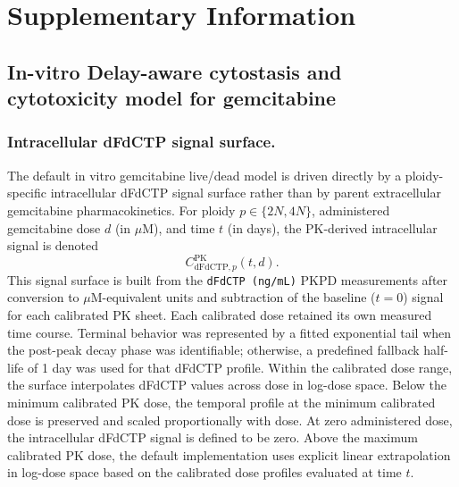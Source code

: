 \documentclass[11pt,notitlepage]{article}
\begin{document}

\clearpage

\section{Supplementary Information}


\renewcommand{\figurename}{Supplementary Figure}
\setcounter{figure}{0}  
\renewcommand{\tablename}{Supplementary Table}
\setcounter{table}{0}  

    
\subsection{In-vitro Delay-aware cytostasis and cytotoxicity model for gemcitabine} \label{LCTmodelinvitro}


\subsubsection{Intracellular dFdCTP signal surface.}\label{dFdCTPsignalsurface}
The default in vitro gemcitabine live/dead model is driven directly by a ploidy-specific intracellular dFdCTP signal surface rather than by parent extracellular gemcitabine pharmacokinetics. For ploidy $p\in\{2N,4N\}$, administered gemcitabine dose $d$ (in $\mu$M), and time $t$ (in days), the PK-derived intracellular signal is denoted
\[
C_{\mathrm{dFdCTP},p}^{\mathrm{PK}}(t,d).
\]
This signal surface is built from the \texttt{dFdCTP (ng/mL)} PKPD measurements after conversion to $\mu$M-equivalent units and subtraction of the baseline ($t=0$) signal for each calibrated PK sheet. Each calibrated dose retained its own measured time course. Terminal behavior was represented by a fitted exponential tail when the post-peak decay phase was identifiable; otherwise, a predefined fallback half-life of 1 day was used for that dFdCTP profile. Within the calibrated dose range, the surface interpolates dFdCTP values across dose in log-dose space. Below the minimum calibrated PK dose, the temporal profile at the minimum calibrated dose is preserved and scaled proportionally with dose. At zero administered dose, the intracellular dFdCTP signal is defined to be zero.
Above the maximum calibrated PK dose, the default implementation uses explicit linear extrapolation in log-dose space based on the calibrated dose profiles evaluated at time $t$.
\end{document}
